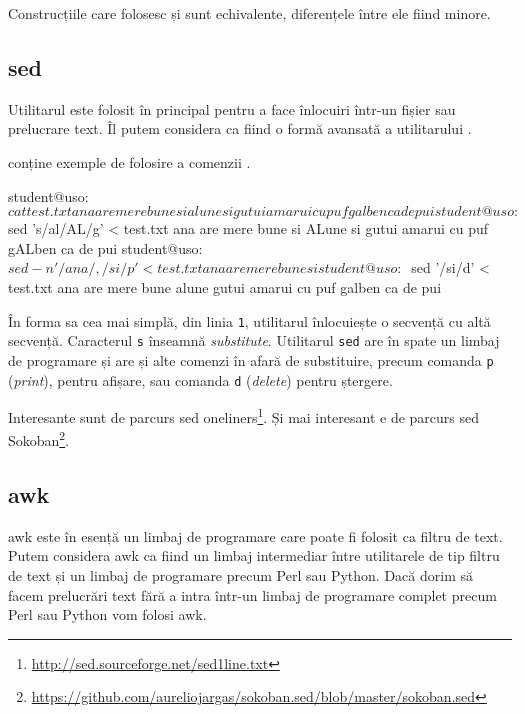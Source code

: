 Construcțiile care folosesc  și  sunt echivalente, diferențele între ele fiind minore.

\subsection{sed}
\label{sec:cli:advanced:sed}

Utilitarul  este folosit în principal pentru a face înlocuiri într-un fișier sau prelucrare text. Îl putem considera ca fiind o formă avansată a utilitarului .

 conține exemple de folosire a comenzii .

\begin{screen}[caption={Folosirea sed},label={lst:cli:sed}]
student@uso:~$ cat test.txt
ana
are
mere
bune
si
alune
si
gutui
amarui
cu
puf
galben
ca
de
pui
student@uso:~$ sed 's/al/AL/g' < test.txt
ana
are
mere
bune
si
ALune
si
gutui
amarui
cu
puf
gALben
ca
de
pui
student@uso:~$ sed -n '/ana/,/si/p' < test.txt
ana
are
mere
bune
si
student@uso:~$ sed '/si/d' < test.txt
ana
are
mere
bune
alune
gutui
amarui
cu
puf
galben
ca
de
pui
\end{screen}

În forma sa cea mai simplă, din linia \texttt{1}, utilitarul înlocuiește o secvență cu altă secvență. Caracterul \texttt{s} înseamnă \textit{substitute}. Utilitarul \texttt{sed} are în spate un limbaj de programare și are și alte comenzi în afară de substituire, precum comanda \texttt{p} (\textit{print}), pentru afișare, sau comanda \texttt{d} (\textit{delete}) pentru ștergere.

Interesante sunt de parcurs sed oneliners\footnote{\url{http://sed.sourceforge.net/sed1line.txt}}. Și mai interesant e de parcurs sed Sokoban\footnote{\url{https://github.com/aureliojargas/sokoban.sed/blob/master/sokoban.sed}}.

\subsection{awk}
\label{sec:cli:advanced:awk}

awk este în esență un limbaj de programare care poate fi folosit ca filtru de
text. Putem considera awk ca fiind un limbaj intermediar între utilitarele de
tip filtru de text și un limbaj de programare precum Perl sau Python. Dacă dorim
să facem prelucrări text fără a intra într-un limbaj de programare complet
precum Perl sau Python vom folosi awk.

